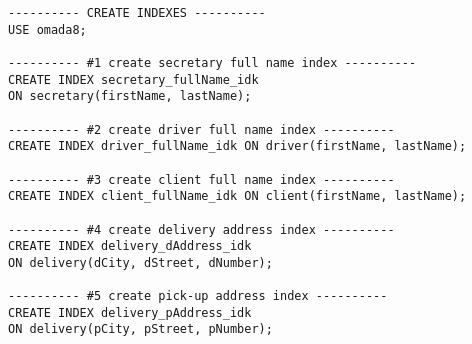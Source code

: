 \begin{lstlisting}
---------- CREATE INDEXES ----------
USE omada8;

---------- #1 create secretary full name index ----------
CREATE INDEX secretary_fullName_idk 
ON secretary(firstName, lastName);

---------- #2 create driver full name index ----------
CREATE INDEX driver_fullName_idk ON driver(firstName, lastName);

---------- #3 create client full name index ----------
CREATE INDEX client_fullName_idk ON client(firstName, lastName);

---------- #4 create delivery address index ----------
CREATE INDEX delivery_dAddress_idk 
ON delivery(dCity, dStreet, dNumber);

---------- #5 create pick-up address index ----------
CREATE INDEX delivery_pAddress_idk 
ON delivery(pCity, pStreet, pNumber);
\end{lstlisting}